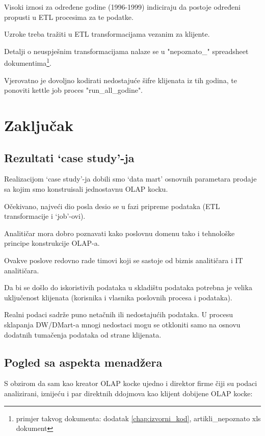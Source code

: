 \documentclass[times, utf8, seminar]{fit}
\begin{document}
Visoki iznosi za određene godine (1996-1999) indiciraju da postoje određeni propusti u ETL procesima za te podatke. 

Uzroke treba tražiti u ETL transformacijama vezanim za klijente. 

Detalji o neuspješnim transformacijama nalaze se u "nepoznato\_" spreadsheet dokumentima\footnote{primjer takvog dokumenta: dodatak \ref{chap:izvorni_kod}, artikli\_nepoznato xls dokument}. 

Vjerovatno je dovoljno kodirati nedostajuće šifre klijenata iz tih godina, te ponoviti kettle job proces "run\_all\_godine".

\chapter{Zaključak}

\section{Rezultati `case study'-ja}

Realizacijom `case study'-ja dobili smo `data mart' osnovnih parametara prodaje sa kojim smo konstruisali jednostavnu OLAP kocku.

Očekivano, najveći dio posla desio se u fazi pripreme podataka (ETL transformacije i `job'-ovi).

Analitičar mora dobro poznavati kako poslovnu domenu tako i tehnološke principe konstrukcije OLAP-a.

Ovakve poslove redovno rade timovi koji se sastoje od biznis analitičara i IT analitičara.

Da bi se došlo do iskoristivih podataka u skladištu podataka potrebna je velika uključenost klijenata (korisnika i vlasnika poslovnih procesa i podataka). 

Realni podaci sadrže puno netačnih ili nedostajućih podataka. U procesu sklapanja DW/DMart-a mnogi nedostaci mogu se otkloniti samo na osnovu dodatnih tumačenja podataka od strane klijenata. 

\section{Pogled sa aspekta menadžera}

S obzirom da sam kao kreator OLAP kocke ujedno i direktor firme čiji su podaci analizirani, iznijeću i par direktnih ddojmova kao klijent dobijene OLAP kocke:
\end{document}
